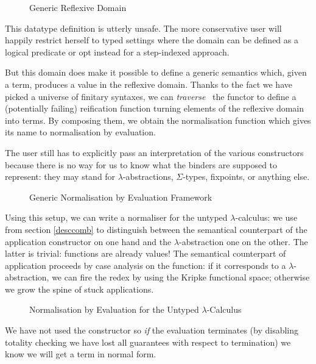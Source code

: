 \begin{figure}[h]
\caption{Generic Reflexive Domain}
\end{figure}

This datatype definition is utterly unsafe. The more conservative
user will happily restrict herself to typed settings where the
domain can be defined as a logical predicate or opt instead for
a step-indexed approach.

But this domain does make it possible to define a generic 
semantics which, given a term, produces a value in the reflexive
domain. Thanks to the fact we have picked a universe of finitary syntaxes, we
can \emph{traverse}~\cite{mcbride_paterson_2008} the functor to define
a (potentially failing) reification function turning elements of the
reflexive domain into terms. By composing them, we obtain the
normalisation function which gives its name to normalisation by
evaluation.

The user still has to explicitly pass an interpretation of
the various constructors because there is no way for us to
know what the binders are supposed to represent: they may
stand for $\lambda$-abstractions, $\Sigma$-types, fixpoints, or
anything else.


\begin{figure}[h]
\caption{Generic Normalisation by Evaluation Framework}
\end{figure}

Using this setup, we can write a normaliser for the untyped
$\lambda$-calculus: we use  from section \ref{desccomb} to distinguish between
the semantical counterpart of the application constructor on
one hand and the $\lambda$-abstraction one on the other.
The latter is trivial: functions are already
values! The semantical counterpart of application proceeds by
case analysis on the function: if it corresponds to a
$\lambda$-abstraction, we can fire the redex by using the Kripke
functional space; otherwise we grow the spine of stuck
applications.

\begin{figure}[h]
\caption{Normalisation by Evaluation for the Untyped $\lambda$-Calculus}
\end{figure}

We have not used the  constructor so \emph{if} the evaluation terminates
(by disabling totality checking we have lost all guarantees with respect to
termination) we know we will get a term in normal form.

